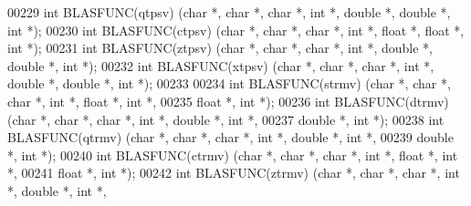 \begin{DoxyCode}
00229 \textcolor{keywordtype}{int} BLASFUNC(qtpsv) (\textcolor{keywordtype}{char} *, \textcolor{keywordtype}{char} *, \textcolor{keywordtype}{char} *, \textcolor{keywordtype}{int} *, \textcolor{keywordtype}{double} *, \textcolor{keywordtype}{double} *, \textcolor{keywordtype}{int} *);
00230 \textcolor{keywordtype}{int} BLASFUNC(ctpsv) (\textcolor{keywordtype}{char} *, \textcolor{keywordtype}{char} *, \textcolor{keywordtype}{char} *, \textcolor{keywordtype}{int} *, \textcolor{keywordtype}{float}  *, \textcolor{keywordtype}{float}  *, \textcolor{keywordtype}{int} *);
00231 \textcolor{keywordtype}{int} BLASFUNC(ztpsv) (\textcolor{keywordtype}{char} *, \textcolor{keywordtype}{char} *, \textcolor{keywordtype}{char} *, \textcolor{keywordtype}{int} *, \textcolor{keywordtype}{double} *, \textcolor{keywordtype}{double} *, \textcolor{keywordtype}{int} *);
00232 \textcolor{keywordtype}{int} BLASFUNC(xtpsv) (\textcolor{keywordtype}{char} *, \textcolor{keywordtype}{char} *, \textcolor{keywordtype}{char} *, \textcolor{keywordtype}{int} *, \textcolor{keywordtype}{double} *, \textcolor{keywordtype}{double} *, \textcolor{keywordtype}{int} *);
00233 
00234 \textcolor{keywordtype}{int} BLASFUNC(strmv) (\textcolor{keywordtype}{char} *, \textcolor{keywordtype}{char} *, \textcolor{keywordtype}{char} *, \textcolor{keywordtype}{int} *, \textcolor{keywordtype}{float}  *, \textcolor{keywordtype}{int} *,
00235              \textcolor{keywordtype}{float}  *, \textcolor{keywordtype}{int} *);
00236 \textcolor{keywordtype}{int} BLASFUNC(dtrmv) (\textcolor{keywordtype}{char} *, \textcolor{keywordtype}{char} *, \textcolor{keywordtype}{char} *, \textcolor{keywordtype}{int} *, \textcolor{keywordtype}{double} *, \textcolor{keywordtype}{int} *,
00237              \textcolor{keywordtype}{double} *, \textcolor{keywordtype}{int} *);
00238 \textcolor{keywordtype}{int} BLASFUNC(qtrmv) (\textcolor{keywordtype}{char} *, \textcolor{keywordtype}{char} *, \textcolor{keywordtype}{char} *, \textcolor{keywordtype}{int} *, \textcolor{keywordtype}{double} *, \textcolor{keywordtype}{int} *,
00239              \textcolor{keywordtype}{double} *, \textcolor{keywordtype}{int} *);
00240 \textcolor{keywordtype}{int} BLASFUNC(ctrmv) (\textcolor{keywordtype}{char} *, \textcolor{keywordtype}{char} *, \textcolor{keywordtype}{char} *, \textcolor{keywordtype}{int} *, \textcolor{keywordtype}{float}  *, \textcolor{keywordtype}{int} *,
00241              \textcolor{keywordtype}{float}  *, \textcolor{keywordtype}{int} *);
00242 \textcolor{keywordtype}{int} BLASFUNC(ztrmv) (\textcolor{keywordtype}{char} *, \textcolor{keywordtype}{char} *, \textcolor{keywordtype}{char} *, \textcolor{keywordtype}{int} *, \textcolor{keywordtype}{double} *, \textcolor{keywordtype}{int} *,

\end{DoxyCode}
